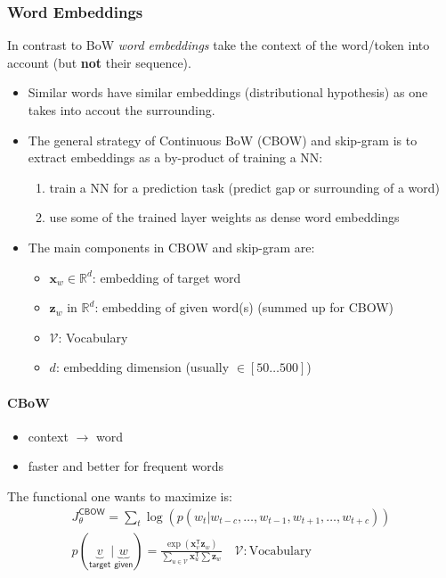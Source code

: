 \subsubsection{Word Embeddings}
In contrast to BoW \textit{word embeddings} take the context of the word/token into account (but \textbf{not} their sequence).
\begin{itemize}
    \item Similar words have similar embeddings (distributional hypothesis) as one takes into accout the surrounding.
    \item The general strategy of Continuous BoW (CBOW) and skip-gram is to extract embeddings as a by-product of training a NN:
          \begin{enumerate}
              \item train a NN for a prediction task (predict gap or surrounding of a word)
              \item use some of the trained layer weights as dense word embeddings
          \end{enumerate}
    \item The main components in CBOW and skip-gram are:
          \begin{itemize}
              \item $\mathbf{x}_w \in \mathbb{R}^d$: embedding of target word
              \item $\mathbf{z} _w$ in $\mathbb{R}^d$: embedding of given word(s) (summed up for CBOW)
              \item $\mathcal{V}$: Vocabulary
              \item $d$: embedding dimension (usually $\in [50\dots500]$)
          \end{itemize}
\end{itemize}

\paragraph{CBoW}
\begin{itemize}
    \item context $\to$ word
    \item faster and better for frequent words
\end{itemize}

The functional one wants to maximize is:
\noindent\begin{gather*}
    J_\theta^{\mathsf{CBOW}}                                               = \sum_{t}\log\left(p(w_t|w_{t-c},\ldots, w_{t-1},w_{t+1},\ldots, w_{t+c})\right)                                   \\
    p(\underbrace{v}_{\textsf{target}} | \underbrace{w}_{\textsf{given}})  = \frac{\exp(\mathbf{x}_v^{\mathsf{T}}\mathbf{z}_w)}{\sum\limits_{u\in \mathcal{V}} \mathbf{x}_u^{\mathsf{T}}\sum\mathbf{z}_w} \quad \mathcal{V}: \text{Vocabulary}
\end{gather*}

